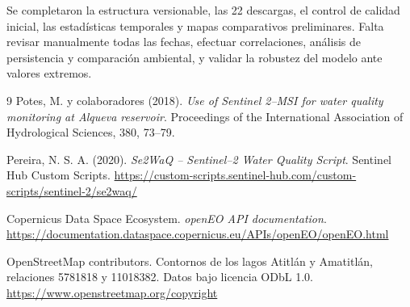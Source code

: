 \documentclass[11pt,letterpaper]{article}
\begin{document}
Se completaron la estructura versionable, las 22 descargas, el control de calidad inicial, las estadísticas temporales y mapas comparativos preliminares. Falta revisar manualmente todas las fechas, efectuar correlaciones, análisis de persistencia y comparación ambiental, y validar la robustez del modelo ante valores extremos.

\begin{thebibliography}{9}
Potes, M. y colaboradores (2018). \textit{Use of Sentinel 2--MSI for water quality monitoring at Alqueva reservoir}. Proceedings of the International Association of Hydrological Sciences, 380, 73--79.

Pereira, N. S. A. (2020). \textit{Se2WaQ -- Sentinel--2 Water Quality Script}. Sentinel Hub Custom Scripts. \url{https://custom-scripts.sentinel-hub.com/custom-scripts/sentinel-2/se2waq/}

Copernicus Data Space Ecosystem. \textit{openEO API documentation}. \url{https://documentation.dataspace.copernicus.eu/APIs/openEO/openEO.html}

OpenStreetMap contributors. Contornos de los lagos Atitlán y Amatitlán, relaciones 5781818 y 11018382. Datos bajo licencia ODbL 1.0. \url{https://www.openstreetmap.org/copyright}
\end{thebibliography}
\end{document}
